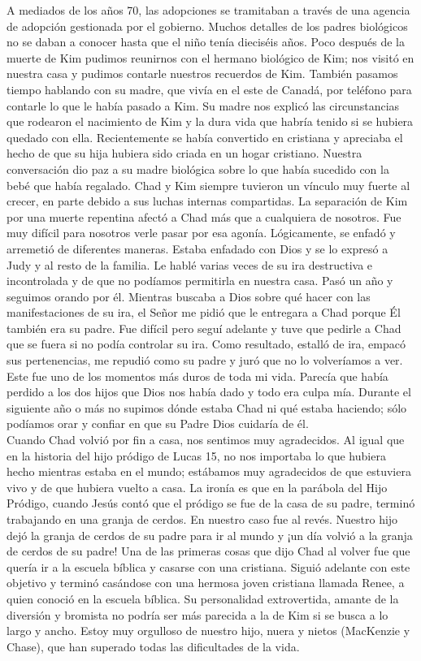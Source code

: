 \documentclass[twoside, 12pt]{book}
\begin{document}
A mediados de los años 70, las adopciones se tramitaban a través de una agencia de adopción gestionada por el gobierno.  Muchos detalles de los padres biológicos no se daban a conocer hasta que el niño tenía dieciséis años. Poco después de la muerte de Kim pudimos reunirnos con el hermano biológico de Kim; nos visitó en nuestra casa y pudimos contarle nuestros recuerdos de Kim.  También pasamos tiempo hablando con su madre, que vivía en el este de Canadá, por teléfono para contarle lo que le había pasado a Kim. Su madre nos explicó las circunstancias que rodearon el nacimiento de Kim y la dura vida que habría tenido si se hubiera quedado con ella. Recientemente se había convertido en cristiana y apreciaba el hecho de que su hija hubiera sido criada en un hogar cristiano. Nuestra conversación dio paz a su madre biológica sobre lo que había sucedido con la bebé que había regalado. Chad y Kim siempre tuvieron un vínculo muy fuerte al crecer, en parte debido a sus luchas internas compartidas. La separación de Kim por una muerte repentina afectó a Chad más que a cualquiera de nosotros. Fue muy difícil para nosotros verle pasar por esa agonía. Lógicamente, se enfadó y arremetió de diferentes maneras. Estaba enfadado con Dios y se lo expresó a Judy y al resto de la familia. Le hablé varias veces de su ira destructiva e incontrolada y de que no podíamos permitirla en nuestra casa. Pasó un año y seguimos orando por él. Mientras buscaba a Dios sobre qué hacer con las manifestaciones de su ira, el Señor me pidió que le entregara a Chad porque Él también era su padre. Fue difícil pero seguí adelante y tuve que pedirle a Chad que se fuera si no podía controlar su ira. Como resultado, estalló de ira, empacó sus pertenencias, me repudió como su padre y juró que no lo volveríamos a ver. Este fue uno de los momentos más duros de toda mi vida. Parecía que había perdido a los dos hijos que Dios nos había dado y todo era culpa mía. Durante el siguiente año o más no supimos dónde estaba Chad ni qué estaba haciendo; sólo podíamos orar y confiar en que su Padre Dios cuidaría de él.\\

Cuando Chad volvió por fin a casa, nos sentimos muy agradecidos. Al igual que en la historia del hijo pródigo de Lucas 15, no nos importaba lo que hubiera hecho mientras estaba en el mundo; estábamos muy agradecidos de que estuviera vivo y de que hubiera vuelto a casa. La ironía es que en la parábola del Hijo Pródigo, cuando Jesús contó que el pródigo se fue de la casa de su padre, terminó trabajando en una granja de cerdos. En nuestro caso fue al revés. Nuestro hijo dejó la granja de cerdos de su padre para ir al mundo y ¡un día volvió a la granja de cerdos de su padre! Una de las primeras cosas que dijo Chad al volver fue que quería ir a la escuela bíblica y casarse con una cristiana. Siguió adelante con este objetivo y terminó casándose con una hermosa joven cristiana llamada Renee, a quien conoció en la escuela bíblica. Su personalidad extrovertida, amante de la diversión y bromista no podría ser más parecida a la de Kim si se busca a lo largo y ancho. Estoy muy orgulloso de nuestro hijo, nuera y nietos (MacKenzie y Chase), que han superado todas las dificultades de la vida.\\
\end{document}
